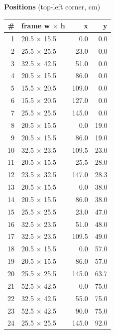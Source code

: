 \documentclass[a4paper,landscape,10pt]{article}
\begin{document}
\begin{minipage}[t]{0.25\textwidth}
\vspace{8pt}
{\bfseries Positions} (top-left corner, cm)\\[2pt]
\tiny
\begin{tabular}{@{}r l r r@{}}
\toprule
\# & frame w $\times$ h & x & y \\
\midrule
1 & 20.5 $\times$ 15.5 & 0.0 & 0.0 \\
2 & 25.5 $\times$ 25.5 & 23.0 & 0.0 \\
3 & 32.5 $\times$ 42.5 & 51.0 & 0.0 \\
4 & 20.5 $\times$ 15.5 & 86.0 & 0.0 \\
5 & 15.5 $\times$ 20.5 & 109.0 & 0.0 \\
6 & 15.5 $\times$ 20.5 & 127.0 & 0.0 \\
7 & 25.5 $\times$ 25.5 & 145.0 & 0.0 \\
8 & 20.5 $\times$ 15.5 & 0.0 & 19.0 \\
9 & 20.5 $\times$ 15.5 & 86.0 & 19.0 \\
10 & 32.5 $\times$ 23.5 & 109.5 & 23.0 \\
11 & 20.5 $\times$ 15.5 & 25.5 & 28.0 \\
12 & 23.5 $\times$ 32.5 & 147.0 & 28.3 \\
13 & 20.5 $\times$ 15.5 & 0.0 & 38.0 \\
14 & 20.5 $\times$ 15.5 & 86.0 & 38.0 \\
15 & 25.5 $\times$ 25.5 & 23.0 & 47.0 \\
16 & 32.5 $\times$ 23.5 & 51.0 & 48.0 \\
17 & 32.5 $\times$ 23.5 & 109.5 & 49.0 \\
18 & 20.5 $\times$ 15.5 & 0.0 & 57.0 \\
19 & 20.5 $\times$ 15.5 & 86.0 & 57.0 \\
20 & 25.5 $\times$ 25.5 & 145.0 & 63.7 \\
21 & 52.5 $\times$ 42.5 & 0.0 & 75.0 \\
22 & 32.5 $\times$ 42.5 & 55.0 & 75.0 \\
23 & 52.5 $\times$ 42.5 & 90.0 & 75.0 \\
24 & 25.5 $\times$ 25.5 & 145.0 & 92.0 \\
\bottomrule
\end{tabular}
\end{minipage}
\clearpage
\end{document}
